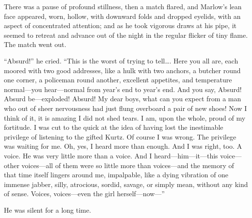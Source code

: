 \documentclass[12pt]{report}
\begin{document}
There was a pause of profound stillness, then a match flared, and
Marlow's lean face appeared, worn, hollow, with downward folds and
dropped eyelids, with an aspect of concentrated attention; and as he
took vigorous draws at his pipe, it seemed to retreat and advance out of
the night in the regular flicker of tiny flame. The match went out.

``Absurd!'' he cried. ``This is the worst of trying to tell\ldots{}.
Here you all are, each moored with two good addresses, like a hulk with
two anchors, a butcher round one corner, a policeman round another,
excellent appetites, and temperature normal---you hear---normal from
year's end to year's end. And you say, Absurd! Absurd be---exploded!
Absurd! My dear boys, what can you expect from a man who out of sheer
nervousness had just flung overboard a pair of new shoes! Now I think of
it, it is amazing I did not shed tears. I am, upon the whole, proud of
my fortitude. I was cut to the quick at the idea of having lost the
inestimable privilege of listening to the gifted Kurtz. Of course I was
wrong. The privilege was waiting for me. Oh, yes, I heard more than
enough. And I was right, too. A voice. He was very little more than a
voice. And I heard---him---it---this voice---other voices---all of them
were so little more than voices---and the memory of that time itself
lingers around me, impalpable, like a dying vibration of one immense
jabber, silly, atrocious, sordid, savage, or simply mean, without any
kind of sense. Voices, voices---even the girl herself---now---''

He was silent for a long time.
\end{document}
